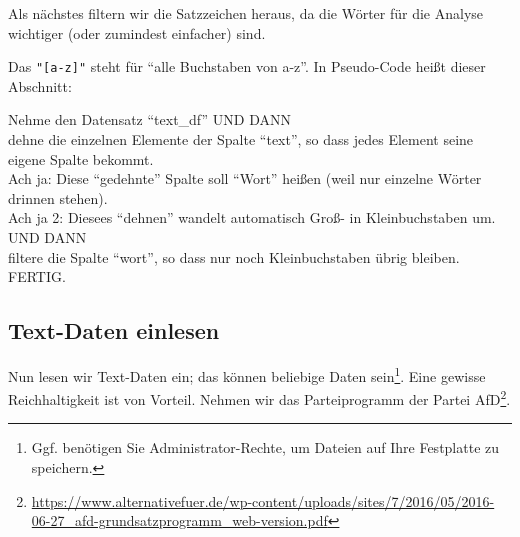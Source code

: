 \documentclass[12pt,]{book}
\makeatletter
\newenvironment{Shaded}{\begin{snugshade}}{\end{snugshade}}
\newcommand{\KeywordTok}[1]{\textcolor[rgb]{0.13,0.29,0.53}{\textbf{{#1}}}}
\newcommand{\StringTok}[1]{\textcolor[rgb]{0.31,0.60,0.02}{{#1}}}
\newcommand{\CommentTok}[1]{\textcolor[rgb]{0.56,0.35,0.01}{\textit{{#1}}}}
\newcommand{\NormalTok}[1]{{#1}}
\newenvironment{kframe}{%
\medskip{}
\setlength{\fboxsep}{.8em}
 \def\at@end@of@kframe{}%
 \ifinner\ifhmode%
  \def\at@end@of@kframe{\end{minipage}}%
  \begin{minipage}{\columnwidth}%
 \fi\fi%
 \def\FrameCommand##1{\hskip\@totalleftmargin \hskip-\fboxsep
 \colorbox{shadecolor}{##1}\hskip-\fboxsep
     \hskip-\linewidth \hskip-\@totalleftmargin \hskip\columnwidth}%
 \MakeFramed {\advance\hsize-\width
   \@totalleftmargin\z@ \linewidth\hsize
   \@setminipage}}%
 {\par\unskip\endMakeFramed%
 \at@end@of@kframe}
\renewenvironment{Shaded}{\begin{kframe}}{\end{kframe}}
\let\BeginKnitrBlock\begin \let\EndKnitrBlock\end
\makeatother
\begin{document}
Als nächstes filtern wir die Satzzeichen heraus, da die Wörter für die
Analyse wichtiger (oder zumindest einfacher) sind.

\begin{Shaded}
\end{Shaded}

Das \texttt{"{[}a-z{]}"} steht für ``alle Buchstaben von a-z''. In
Pseudo-Code heißt dieser Abschnitt:

\BeginKnitrBlock{rmdpseudocode}
Nehme den Datensatz ``text\_df'' UND DANN\\
dehne die einzelnen Elemente der Spalte ``text'', so dass jedes Element
seine eigene Spalte bekommt.\\
Ach ja: Diese ``gedehnte'' Spalte soll ``Wort'' heißen (weil nur
einzelne Wörter drinnen stehen).\\
Ach ja 2: Diesees ``dehnen'' wandelt automatisch Groß- in
Kleinbuchstaben um. UND DANN\\
filtere die Spalte ``wort'', so dass nur noch Kleinbuchstaben übrig
bleiben. FERTIG.
\EndKnitrBlock{rmdpseudocode}

\subsection{Text-Daten einlesen}\label{text-daten-einlesen}

Nun lesen wir Text-Daten ein; das können beliebige Daten sein\footnote{Ggf.
  benötigen Sie Administrator-Rechte, um Dateien auf Ihre Festplatte zu
  speichern.}. Eine gewisse Reichhaltigkeit ist von Vorteil. Nehmen wir
das Parteiprogramm der Partei AfD\footnote{\url{https://www.alternativefuer.de/wp-content/uploads/sites/7/2016/05/2016-06-27_afd-grundsatzprogramm_web-version.pdf}}.
\end{document}
